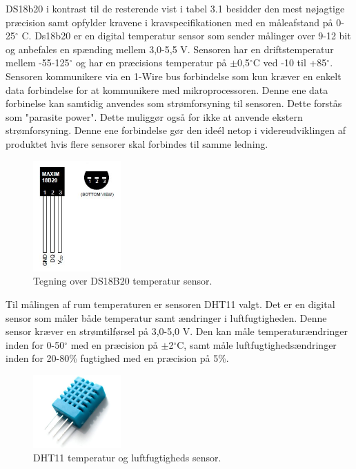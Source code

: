 DS18b20 i kontrast til de resterende vist i tabel 3.1 besidder den mest nøjagtige præcision samt opfylder kravene i kravspecifikationen med en måleafstand på 0-25$^{\circ}$ C. \newline
Ds18b20 er en digital temperatur sensor som sender målinger over 9-12 bit og anbefales en spænding mellem 3,0-5,5 V. \newline
Sensoren har en driftstemperatur mellem -55-125$^{\circ}$ og har en præcisions temperatur på $\pm$0,5$^{\circ}$C ved -10 til +85$^{\circ}$. Sensoren kommunikere via en 1-Wire bus forbindelse som kun kræver en enkelt data forbindelse for at kommunikere med mikroprocessoren. Denne ene data forbinelse kan samtidig anvendes som strømforsyning til sensoren. Dette forstås som "parasite power". Dette muliggør også for ikke at anvende ekstern strømforsyning. 
Denne ene forbindelse gør den ideél netop i videreudviklingen af produktet hvis flere sensorer skal forbindes til samme ledning.

\begin{figure}[h!]
  \centering
  \includegraphics[width=0.3\textwidth]{figures/ds18b20-pinout.jpg}
  \caption{Tegning over DS18B20 temperatur sensor.}
  \label{ds18b20_pins}
\end{figure} 

Til målingen af rum temperaturen er sensoren DHT11 valgt. Det er en digital sensor som måler både temperatur samt ændringer i luftfugtigheden. Denne sensor kræver en strømtilførsel på 3,0-5,0 V. \newline
Den kan måle temperaturændringer inden for 0-50$^{\circ}$ med en præcision på $\pm$2$^{\circ}$C, samt måle luftfugtighedsændringer inden for 20-80\% fugtighed med en præcision på 5\%. 

\begin{figure}[h!]
  \centering
  \includegraphics[width=0.3\textwidth]{figures/DHT11.jpg}
  \caption{DHT11 temperatur og luftfugtigheds sensor.}
  \label{dht11_billede}
\end{figure} 
   






\newpage
